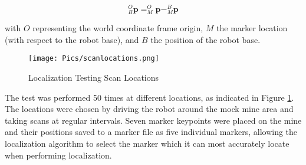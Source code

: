 \begin{equation*}
^O_B\mathbf{p} = ^O_M\mathbf{p} - ^B_M\mathbf{p}
\end{equation*}

with $O$ representing the world coordinate frame origin, $M$ the marker location (with respect to the robot base), and $B$ the position of the robot base.\\

\begin{figure}
    \centering
    \texttt{[image: Pics/scanlocations.png]}
    \caption{Localization Testing Scan Locations}
    \label{fig:scanlocations}
\end{figure}

The test was performed 50 times at different locations, as indicated in Figure \ref{fig:scanlocations}. The locations were chosen by driving the robot around the mock mine area and taking scans at regular intervals. Seven marker keypoints were placed on the mine and their positions saved to a marker file as five individual markers, allowing the localization algorithm to select the marker which it can most accurately locate when performing localization.\\


